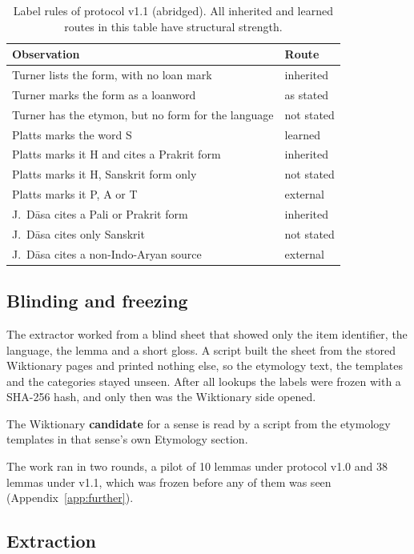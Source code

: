 \documentclass[11pt]{article}
\begin{document}
\begin{table}[t]
\centering\small
\begin{tabular}{p{}p{}}
\toprule
\textbf{Observation} & \textbf{Route} \\
\midrule
Turner lists the form, with no loan mark & inherited \\
Turner marks the form as a loanword & as stated \\
Turner has the etymon, but no form for the language & not stated \\
Platts marks the word S & learned \\
Platts marks it H and cites a Prakrit form & inherited \\
Platts marks it H, Sanskrit form only & not stated \\
Platts marks it P, A or T & external \\
J.~D\=asa cites a Pali or Prakrit form & inherited \\
J.~D\=asa cites only Sanskrit & not stated \\
J.~D\=asa cites a non-Indo-Aryan source & external \\
\bottomrule
\end{tabular}
\caption{Label rules of protocol v1.1 (abridged). All inherited and learned routes in this table have structural strength.}
\label{tab:rules}
\end{table}

\subsection{Blinding and freezing}

The extractor worked from a blind sheet that showed only the item identifier, the language, the lemma and a short gloss. A script built the sheet from the stored Wiktionary pages and printed nothing else, so the etymology text, the templates and the categories stayed unseen. After all lookups the labels were frozen with a SHA-256 hash, and only then was the Wiktionary side opened.

The Wiktionary \textbf{candidate} for a sense is read by a script from the etymology templates in that sense's own Etymology section.

The work ran in two rounds, a pilot of 10 lemmas under protocol v1.0 and 38 lemmas under v1.1, which was frozen before any of them was seen (Appendix~\ref{app:further}).

\subsection{Extraction}
\label{sec:extraction}
\end{document}
